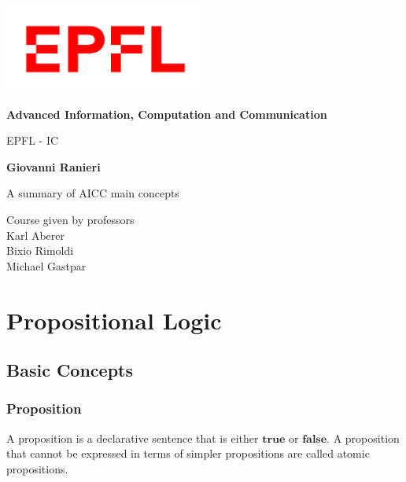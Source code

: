 \documentclass{article}
\begin{document}
\begin{titlepage}
    \begin{center}
        \vspace*{1cm}
            
		\includegraphics[width=0.5\textwidth]{epfl.jpeg}               
            
        \Huge
        \textbf{Advanced Information, Computation and Communication}
            
        \vspace{0.5cm}
        \LARGE
        EPFL - IC
            
        \vspace{0.8cm}
            
        \textbf{Giovanni Ranieri}
            
        \vfill
            
        A summary of AICC main concepts\\
        
		\vspace{0.8cm}     
        
        Course given by professors\\
        Karl Aberer\\
        Bixio Rimoldi\\
        Michael Gastpar
            
        \vspace{0.8cm}
            
    \end{center}
\end{titlepage}

\tableofcontents

\newpage
\section{Propositional Logic}
\subsection{Basic Concepts}
\subsubsection{Proposition}
A proposition is a declarative sentence that is either $ \textbf{true} $ or $ \textbf{false} $. A proposition that cannot be expressed in terms of simpler propositions are called atomic propositions.
\end{document}
